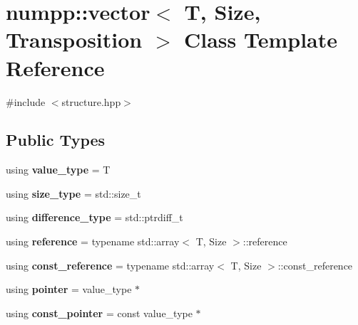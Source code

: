 \hypertarget{classnumpp_1_1vector}{}\section{numpp\+:\+:vector$<$ T, Size, Transposition $>$ Class Template Reference}
\label{classnumpp_1_1vector}


{\ttfamily \#include $<$structure.\+hpp$>$}

\subsection*{Public Types}
\begin{DoxyCompactItemize}
\item 
\mbox{\label{classnumpp_1_1vector_a7b2560fd597d173de79e59646758e494}} 
using {\bfseries value\+\_\+type} = T
\item 
\mbox{\label{classnumpp_1_1vector_aaef4605e241af000e8d48a159972435c}} 
using {\bfseries size\+\_\+type} = std\+::size\+\_\+t
\item 
\mbox{\label{classnumpp_1_1vector_a916b870a14ac1e76e8eab22b5c86d223}} 
using {\bfseries difference\+\_\+type} = std\+::ptrdiff\+\_\+t
\item 
\mbox{\label{classnumpp_1_1vector_aafa7cc182e3024a9313adc6a04d42302}} 
using {\bfseries reference} = typename std\+::array$<$ T, Size $>$\+::reference
\item 
\mbox{\label{classnumpp_1_1vector_a9c682af3da1dc34cb68c15585b06b19c}} 
using {\bfseries const\+\_\+reference} = typename std\+::array$<$ T, Size $>$\+::const\+\_\+reference
\item 
\mbox{\label{classnumpp_1_1vector_acf8e239235faf0d77433f8c7133743b8}} 
using {\bfseries pointer} = value\+\_\+type $\ast$
\item 
\mbox{\label{classnumpp_1_1vector_af533028c9a99dc86174df15ae28f323a}} 
using {\bfseries const\+\_\+pointer} = const value\+\_\+type $\ast$
\item 
\mbox{\label{classnumpp_1_1vector_abe494178a87f1be7dfe8078465dc1534}} 

\end{DoxyCompactItemize}
